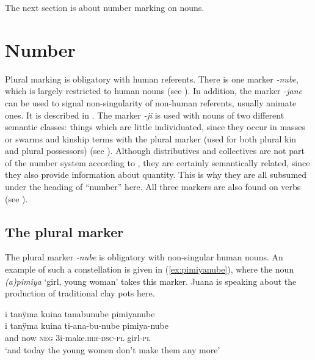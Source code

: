 

The next section is about number marking on nouns.


\section{Number}\label{sec:NumberNouns}

Plural marking is obligatory with human referents. There is one  marker \textit{-nube}, which is largely restricted to human nouns (see ). In addition, the  marker \textit{-jane} can be used to signal non-singularity of non-human referents, usually animate ones. It is described in . The  marker \textit{-ji} is used with nouns of two different semantic classes: things which are little individuated, since they occur in masses or swarms and kinship terms with the plural marker (used for both plural kin and plural possessors) (see ). Although distributives and collectives are not part of the number system according to \citet[117, 119, 120]{Corbett2000}, they are certainly semantically related, since they also provide information about quantity. This is why they are all subsumed under the heading of “number” here. All three markers are also found on verbs (see ).

\subsection{The plural marker}\label{sec:NounsPL-nube}

The plural marker \textit{-nube} is obligatory with non-singular human nouns. An example of such a constellation is given in (\ref{ex:pimiyanube}), where the noun \textit{(a)pimiya} ‘girl, young woman’ takes this marker.
Juana is speaking about the production of traditional clay pots here.

\ea\label{ex:pimiyanube}
\begingl 
\glpreamble i tanÿma kuina tanabunube pimiyanube\\
\gla i tanÿma kuina ti-ana-bu-nube pimiya-nube\\ 
\glb and now \textsc{neg} 3i-make.\textsc{irr}-\textsc{dsc}-\textsc{pl} girl-\textsc{pl}\\ 
\glft ‘and today the young women don’t make them any more’
\trailingcitation{[jxx-p120430l-2.547]}
\xe

